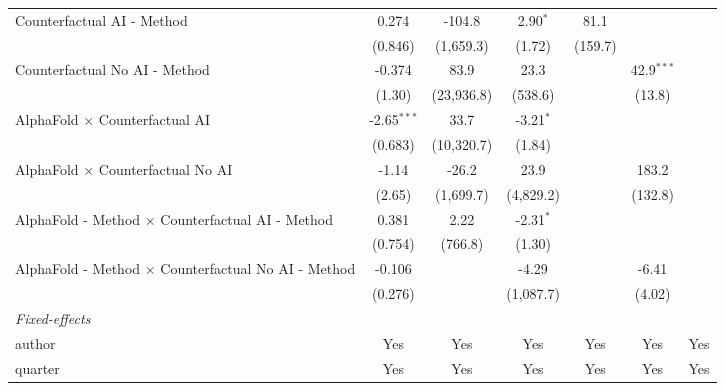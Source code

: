\begin{tabular}{lcccccc}
   Counterfactual AI - Method                                 & 0.274         & -104.8     & 2.90$^{*}$  & 81.1         &               &   \\   
                                                              & (0.846)       & (1,659.3)  & (1.72)      & (159.7)      &               &   \\   
   Counterfactual No AI - Method                              & -0.374        & 83.9       & 23.3        &              & 42.9$^{***}$  &   \\   
                                                              & (1.30)        & (23,936.8) & (538.6)     &              & (13.8)        &   \\   
   AlphaFold $\times$ Counterfactual AI                       & -2.65$^{***}$ & 33.7       & -3.21$^{*}$ &              &               &   \\   
                                                              & (0.683)       & (10,320.7) & (1.84)      &              &               &   \\   
   AlphaFold $\times$ Counterfactual No AI                    & -1.14         & -26.2      & 23.9        &              & 183.2         &   \\   
                                                              & (2.65)        & (1,699.7)  & (4,829.2)   &              & (132.8)       &   \\   
   AlphaFold - Method $\times$ Counterfactual AI - Method     & 0.381         & 2.22       & -2.31$^{*}$ &              &               &   \\   
                                                              & (0.754)       & (766.8)    & (1.30)      &              &               &   \\   
   AlphaFold - Method $\times$ Counterfactual No AI - Method  & -0.106        &            & -4.29       &              & -6.41         &   \\   
                                                              & (0.276)       &            & (1,087.7)   &              & (4.02)        &   \\   
   \midrule
   \emph{Fixed-effects}\\
   author                                                     & Yes           & Yes        & Yes         & Yes          & Yes           & Yes\\  
   quarter                                                    & Yes           & Yes        & Yes         & Yes          & Yes           & Yes\\  

\end{tabular}
